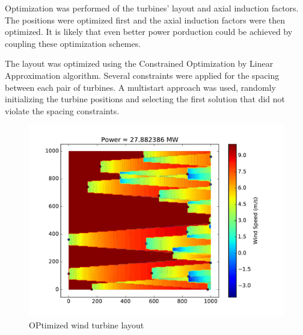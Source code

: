 \documentclass{article}
\begin{document}
Optimization was performed of the turbines' layout and axial induction factors. The positions were optimized first and the axial induction factors were then optimized. It is likely that even better power porduction could be achieved by coupling these optimization schemes.

The layout was optimized using the Constrained Optimization by Linear Approximation algorithm. Several constraints were applied for the spacing between each pair of turbines. A multistart approach was used, randomly initializing the turbine positions and selecting the first solution that did not violate the spacing constraints.

\begin{figure}[htb!]
\centering
\includegraphics[scale=.6]{optlayout1}
\caption{\label{opt} OPtimized wind turbine layout}
\end{figure}
\end{document}
